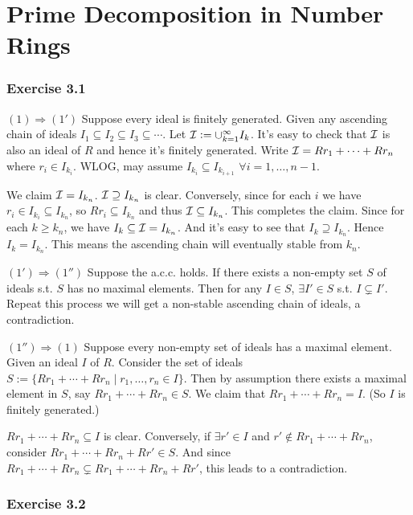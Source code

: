 \documentclass[../Marcus.tex]{subfiles}
\begin{document}
\chapter{Prime Decomposition in Number Rings}

\subsection*{Exercise 3.1}

$(1)\Rightarrow(1')$ Suppose every ideal is finitely generated. Given any ascending chain of ideals $I_1\subseteq I_2\subseteq I_3\subseteq\cdots$. Let $\mathcal{I}:=\cup_{k=1}^\infty I_k$. It's easy to check that $\mathcal{I}$ is also an ideal of $R$ and hence it's finitely generated. Write $\mathcal{I}=Rr_1+\cdots+Rr_n$ where $r_i\in I_{k_i}$. WLOG, may assume $I_{k_i}\subseteq I_{k_{i+1}}$ $\forall i=1,\ldots,n-1$. 

We claim $\mathcal{I}=I_{k_n}$. $\mathcal{I}\supseteq I_{k_n}$ is clear. Conversely, since for each $i$ we have $r_i\in I_{k_i}\subseteq I_{k_n}$, so $Rr_i\subseteq I_{k_n}$ and thus $\mathcal{I}\subseteq I_{k_n}$. This completes the claim. Since for each $k\geq k_n$, we have $I_k\subseteq \mathcal{I}=I_{k_n}$. And it's easy to see that $I_k\supseteq I_{k_n}$. Hence $I_k=I_{k_n}$. This means the ascending chain will eventually stable from $k_n$.

$(1')\Rightarrow(1'')$ Suppose the a.c.c. holds. If there exists a non-empty set $S$ of ideals s.t. $S$ has no maximal elements. Then for any $I\in S$, $\exists I'\in S$ s.t. $I\varsubsetneq I'$. Repeat this process we will get a non-stable ascending chain of ideals, a contradiction.

$(1'')\Rightarrow(1)$ Suppose every non-empty set of ideals has a maximal element. Given an ideal $I$ of $R$. Consider the set of ideals $S:=\{Rr_1+\cdots+Rr_n\mid r_1,\ldots,r_n\in I\}$. Then by assumption there exists a maximal element in $S$, say $Rr_1+\cdots+Rr_n \in S$. We claim that $Rr_1+\cdots+Rr_n=I$. (So $I$ is finitely generated.)

$Rr_1+\cdots+Rr_n\subseteq I$ is clear. Conversely, if $\exists r'\in I$ and $r'\notin Rr_1+\cdots+Rr_n$, consider $Rr_1+\cdots+Rr_n+Rr' \in S$. And since $Rr_1+\cdots+Rr_n \varsubsetneq Rr_1+\cdots+Rr_n+Rr'$, this leads to a contradiction.

\subsection*{Exercise 3.2}
\end{document}
